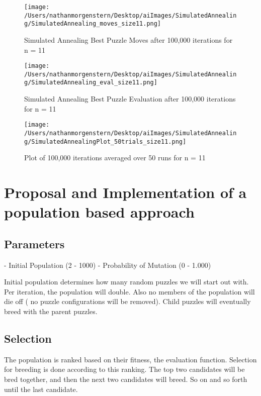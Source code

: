 \documentclass{report}
\begin{document}
	\begin{figure}[H]
	\centering
	\texttt{[image: /Users/nathanmorgenstern/Desktop/aiImages/SimulatedAnnealing/SimulatedAnnealing\_moves\_size11.png]}
	\caption{Simulated Annealing Best Puzzle Moves after 100,000 iterations for n = 11} 
	\label{fig: Simulated Annealing Best Puzzle Moves after 100,000 iterations for n = 11}
	\end{figure}

	\begin{figure}[H]
	\centering
	\texttt{[image: /Users/nathanmorgenstern/Desktop/aiImages/SimulatedAnnealing/SimulatedAnnealing\_eval\_size11.png]}
	\caption{Simulated Annealing Best Puzzle Evaluation after 100,000 iterations for n = 11} 
	\label{fig: Simulated Annealing Best Puzzle Evaluation after 100,000 iterations for n = 11} 
	\end{figure}

	\begin{figure}[H]
	\centering
	\texttt{[image: /Users/nathanmorgenstern/Desktop/aiImages/SimulatedAnnealing/SimulatedAnnealingPlot\_50trials\_size11.png]}
	\caption{Plot of 100,000 iterations averaged over 50 runs for n = 11}
	\label{fig: Plot of 100,000 iterations averaged over 50 runs for n = 11}
	\end{figure}

\newpage
\section{Proposal and Implementation of a population based approach}
\subsection{Parameters}
	- Initial Population (2 - 1000)
	- Probability of Mutation (0 - 1.000)

Initial population determines how many random puzzles we will start out with. Per iteration, the population will double. Also no members of the population will die off ( no puzzle configurations will be removed). Child puzzles will eventually breed with the parent puzzles.


\subsection{Selection}
The population is ranked based on their fitness, the evaluation function. Selection for breeding is done according to this ranking. The top two candidates will be bred together, and then the next two candidates will breed. So on and so forth until the last candidate.
\end{document}

